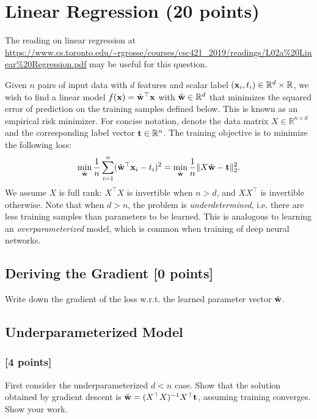 \documentclass[11pt]{article}
\newcommand{\R}{\mathbb{R}} %
\begin{document}
\section {Linear Regression (20 points)}
    The reading on linear regression at \url{https://www.cs.toronto.edu/~rgrosse/courses/csc421_2019/readings/L02a%20Linear%20Regression.pdf} may be useful for this question.

    Given $n$ pairs of input data with $d$ features and scalar label $(\bx_i,t_i)\in\R^{d}\times\R$, we wish to find a linear model $f(\mathbf{x}) = \hat{\mathbf{w}}^\top\mathbf{x}$ with $\hat{\bw}\in\R^d$ that minimizes the squared error of prediction on the training samples defined below.
    This is known as an empirical risk minimizer.
    For concise notation, denote the data matrix $X\in\R^{n\times d}$ and the corresponding label vector $\bt\in\R^n$.
    The training objective is to minimize the following loss:
    \begin{align*}
        \underset{\hat{\mathbf{w}}}{\mathrm{min}} \,\frac{1}{n}\sum_{i=1}^n (\hat{\mathbf{w}}^\top\mathbf{x}_i - t_i)^2 
    =   
        \underset{\hat{\mathbf{w}}}{\mathrm{min}} \,\frac{1}{n}\|X\hat{\mathbf{w}} - \mathbf{t}\|_2^2. 
    \end{align*}
    We assume $X$ is full rank: $X^\top X$ is invertible when $n>d$, and $X X^\top$ is invertible otherwise. Note that when $d>n$, the problem is \textit{underdetermined}, i.e. there are less training samples than parameters to be learned.
    This is analogous to learning an \textit{overparameterized} model, which is common when training of deep neural networks.
   
   \subsection{Deriving the Gradient {[0 points]}}\label{sec:a}
    Write down the gradient of the loss w.r.t. the learned parameter vector $\hat{\mathbf{w}}$.

   \subsection{Underparameterized Model} \label{sec:b}
   
   \subsubsection{{\color{blue}[4 points]}}
    First consider the underparameterized $d<n$ case.
    Show that the solution obtained by gradient descent is $\hat{\mathbf{w}} = (X^\top X)^{-1} X^\top\mathbf{t}$, assuming training converges. Show your work. \\
\end{document}
